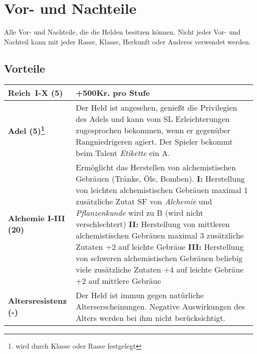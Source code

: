 {\let\clearpage\relax\chapter{Vor- und Nachteile}
\label{chap:vor_und_nachteile}}
Alle Vor- und Nachteile, die die Helden besitzen können. Nicht jeder Vor- und Nachteil kann mit jeder Rasse, Klasse, Herkunft oder Anderes verwendet werden.

\section{Vorteile}
\label{chap:vorteile}
\begin{longtable}{|p{5cm}|p{11cm}|}

\hline
\textbf{Reich~I-X (5)} & +500Kr. pro Stufe \\ \hline

\textbf{Adel (5)\footnote{wird durch Klasse oder Rasse festgelegt}} & Der Held ist angesehen, genießt die Privilegien des Adels und kann vom SL Erleichterungen zugesprochen bekommen, wenn er gegenüber Rangniedrigeren agiert. Der Spieler bekommt beim Talent \textit{Etikette} ein A. \\ \hline

\textbf{Alchemie I-III (20)} & Ermöglicht das Herstellen von alchemistischen Gebräuen (Tränke, Öle, Bomben). \newline \textbf{I:} Herstellung von leichten alchemistischen Gebräuen \newline maximal 1 zusätzliche Zutat \newline SF von \textit{Alchemie} und \textit{Pflanzenkunde} wird zu B (wird nicht verschlechtert) \newline \textbf{II:} Herstellung von mittleren alchemistischen Gebräuen \newline maximal 3 zusätzliche Zutaten \newline +2 auf leichte Gebräue \newline \textbf{III:} Herstellung von schweren alchemistischen Gebräuen \newline beliebig viele zusätzliche Zutaten \newline +4 auf leichte Gebräue \newline +2 auf mittlere Gebräue \\ \hline

\textbf{Altersresistenz (-)\footnotemark[1]} & Der Held ist immun gegen natürliche Alterserscheinungen. Negative Auswirkungen des Alters werden bei ihm nicht berücksichtigt. \\ \hline


\end{longtable}

